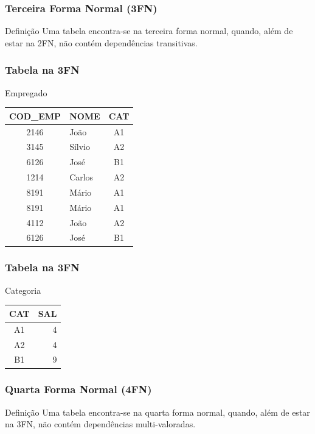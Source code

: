 \documentclass{beamer}
\begin{document}
\begin{frame}
\frametitle{Terceira Forma Normal (3FN)}

\begin{block}{Definição}
	Uma tabela encontra-se na terceira forma normal, quando, além de estar na 2FN, não contém dependências transitivas.
\end{block}	
\end{frame}

\begin{frame}
\frametitle{Tabela na 3FN}

\begin{exampleblock}{Empregado}
	\centering
	\begin{tabular}{| c | l | c | }
		\hline
		COD\_EMP & NOME & CAT \\\hline
		2146 & João & A1  \\\hline
		3145 & Sílvio & A2 \\\hline
		6126 & José & B1 \\\hline
		1214 & Carlos & A2 \\\hline
		8191 & Mário & A1 \\\hline
		8191 & Mário & A1 \\\hline
		4112 & João & A2 \\\hline
		6126 & José & B1 \\\hline
	\end{tabular}
\end{exampleblock}
\end{frame}

\begin{frame}
\frametitle{Tabela na 3FN}

\begin{exampleblock}{Categoria}
	\centering
	\begin{tabular}{| c | r | }
		\hline
		CAT & SAL \\\hline
		A1 & 4 \\\hline
		A2 & 4 \\\hline
		B1 & 9 \\\hline
	\end{tabular}
\end{exampleblock}	
\end{frame}

\begin{frame}
\frametitle{Quarta Forma Normal (4FN)}

\begin{block}{Definição}
Uma tabela encontra-se na quarta forma normal, quando, além de estar na 3FN, não contém dependências multi-valoradas.
\end{block}
\end{frame}
\end{document}

